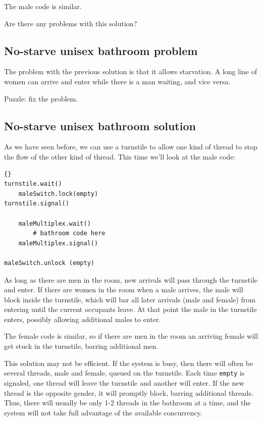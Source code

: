 \documentclass{book}
\newcommand{\clearemptydoublepage}{\newpage\cleardoublepage}
\begin{document}
The male code is similar.

Are there any problems with this solution?

\clearemptydoublepage
\subsection {No-starve unisex bathroom problem}

The problem with the previous solution is that it allows starvation.
A long line of women can arrive and enter while there is a man
waiting, and vice versa.

Puzzle: fix the problem.


\clearemptydoublepage
\subsection {No-starve unisex bathroom solution}

As we have seen before, we can use a turnstile to allow one
kind of thread to stop the flow of the other kind of thread.
This time we'll look at the male code:

\begin{latin}
\begin{lstlisting}[title={No-starve unisex bathroom solution (male)}]{}
turnstile.wait()
    maleSwitch.lock(empty)
turnstile.signal()

    maleMultiplex.wait()
        # bathroom code here
    maleMultiplex.signal()

maleSwitch.unlock (empty)
\end{lstlisting}
\end{latin}

As long as there are men in the room, new arrivals will pass
through the turnstile and enter.  If there are women in the room
when a male arrives, the male will block inside the turnstile,
which will bar all later arrivals (male and female) from entering
until the current occupants leave.  At that point the male in
the turnstile enters, possibly allowing additional males to enter.

The female code is similar, so if there are men in the room an
arriving female will get stuck in the turnstile, barring additional
men.

This solution may not be efficient.  If
the system is busy, then there will often be several threads, male and
female, queued on the turnstile.  Each time {\tt empty} is signaled,
one thread will leave the turnstile and another will enter.  If the
new thread is the opposite gender, it will promptly block, barring
additional threads.  Thus, there will usually be only 1-2 threads in
the bathroom at a time, and the system will not take full advantage
of the available concurrency.
\end{document}
